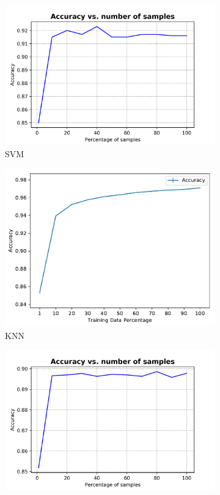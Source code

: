 \documentclass[10pt]{scrartcl}
\begin{document}
\begin{figure}[H]
	\centering
	\begin{subfigure}{0.4\linewidth}
		\centering
		\includegraphics[width=1\linewidth]{figures/accuracy_vs_samples_svm_tuned.png}
		\caption{SVM}\label{fig:1a}		
	\end{subfigure}
	\begin{subfigure}{0.35\linewidth}
		\centering
		\includegraphics[width=1\linewidth]{figures/KNN_accuracy_vs_tss_with_fixed_k.pdf}
		\caption{KNN}\label{fig:1b}
	\end{subfigure}
	\begin{subfigure}{0.4\linewidth}
		\centering
		\includegraphics[width=1\linewidth]{figures/accuracy_vs_samples_neural_net_tuned.png}

\end{subfigure}
\end{figure}
\end{document}
